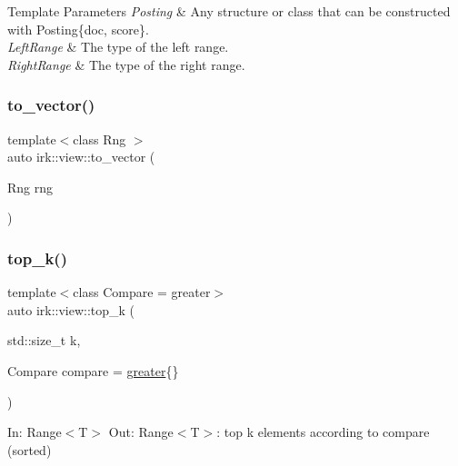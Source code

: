 \begin{DoxyTemplParams}{Template Parameters}
{\em Posting} & Any structure or class that can be constructed with {\ttfamily Posting\{doc, score\}}. \\
\hline
{\em Left\+Range} & The type of the left range. \\
\hline
{\em Right\+Range} & The type of the right range. \\
\hline
\end{DoxyTemplParams}
\mbox{\label{namespaceirk_1_1view_a4c57f6b275583eb4259ab6adac064984}} 
\subsubsection{\texorpdfstring{to\+\_\+vector()}{to\_vector()}}
{\footnotesize\ttfamily template$<$class Rng $>$ \\
auto irk\+::view\+::to\+\_\+vector (\begin{DoxyParamCaption}\item[{Rng}]{rng }\end{DoxyParamCaption})}

\mbox{\label{namespaceirk_1_1view_a63bf7fddcce8cadbb9bf78e34930993d}} 
\subsubsection{\texorpdfstring{top\+\_\+k()}{top\_k()}\hspace{0.1cm}{\footnotesize\ttfamily [1/2]}}
{\footnotesize\ttfamily template$<$class Compare  = greater$>$ \\
auto irk\+::view\+::top\+\_\+k (\begin{DoxyParamCaption}\item[{std\+::size\+\_\+t}]{k,  }\item[{Compare}]{compare = {\ttfamily \mbox{\hyperlink{structirk_1_1view_1_1greater}{greater}}\{\}} }\end{DoxyParamCaption})}

In\+: Range$<$\+T$>$ Out\+: Range$<$\+T$>$\+: top k elements according to compare (sorted) \mbox{\label{namespaceirk_1_1view_a39f5f931fdce5219b2bd043175f1890c}} 

